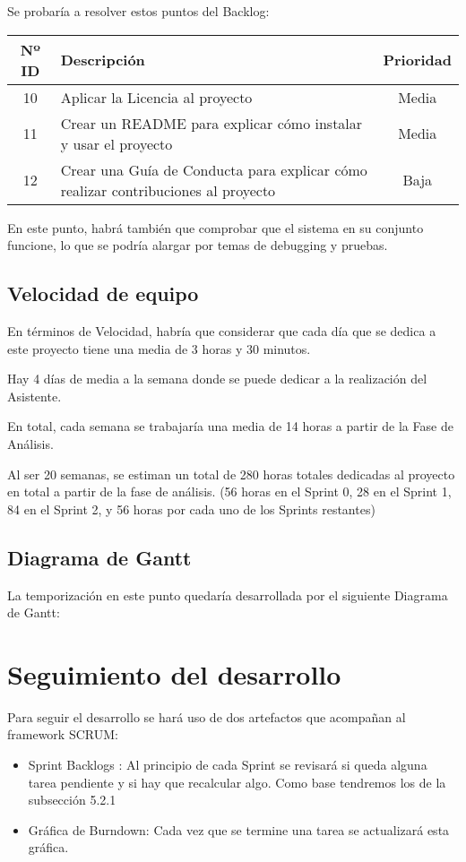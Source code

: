 Se probaría a resolver estos puntos del Backlog:
\begin{table}[H]
	\begin{tabularx}{\textwidth}{|c|X|c|}
		\hline
		\textbf{Nº ID} & \textbf{Descripción} & \textbf{Prioridad} \\
		\hline
		10 &  Aplicar la Licencia al proyecto & Media \\
		\hline
		11 & Crear un README para explicar cómo instalar y usar el proyecto & Media \\
		\hline
		12 & Crear una Guía de Conducta para explicar cómo realizar contribuciones al proyecto & Baja \\
		\hline
	\end{tabularx}
\end{table}

En este punto, habrá también que comprobar que el sistema en su conjunto funcione, lo que se podría alargar por temas de debugging y pruebas.

\subsection{Velocidad de equipo}
En términos de Velocidad, habría que considerar que cada día que se dedica a este proyecto tiene una media de 3 horas y 30 minutos.

Hay 4 días de media a la semana donde se puede dedicar a la realización del Asistente. 

En total, cada semana se trabajaría una media de 14 horas a partir de la Fase de Análisis.

Al ser 20 semanas, se estiman un total de 280 horas totales dedicadas al proyecto en total a partir de la fase de análisis. (56 horas en el Sprint 0, 28 en el Sprint 1, 84 en el Sprint 2, y 56 horas por cada uno de los Sprints restantes)

\subsection{Diagrama de Gantt}
La temporización en este punto quedaría desarrollada por el siguiente Diagrama de Gantt:


\section{Seguimiento del desarrollo}
Para seguir el desarrollo se hará uso de dos artefactos que acompañan al framework SCRUM:
\begin{itemize}
	\item Sprint Backlogs : Al principio de cada Sprint se revisará si queda alguna tarea pendiente y si hay que recalcular algo. Como base tendremos los de la subsección 5.2.1
	\item Gráfica de Burndown: Cada vez que se termine una tarea se actualizará esta gráfica.
\end{itemize}

